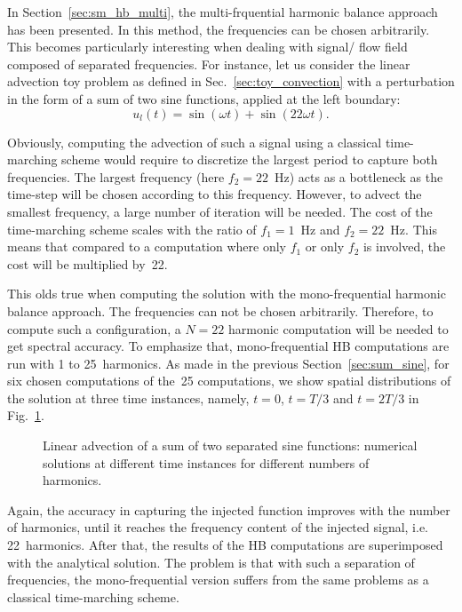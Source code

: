 
In Section~\ref{sec:sm_hb_multi}, the multi-frquential harmonic
balance approach has been presented. In this method,
the frequencies can be chosen arbitrarily. This becomes particularly
interesting when dealing with signal/ flow field composed of separated
frequencies. For instance, let us consider the linear advection toy problem
as defined in Sec.~\ref{sec:toy_convection} with 
a perturbation 
in the form of a sum of two sine functions,
applied at the left boundary:
\begin{equation}
    u_l(t) = \sin(\omega t) + \sin(22 \omega t).
    \label{eq:multifreq_inj_func}
\end{equation}

Obviously, computing the advection of such a signal using
a classical time-marching scheme would require to discretize the
largest period to capture both frequencies. The largest frequency
(here $f_2 = 22$~Hz) acts as a bottleneck as the time-step will be chosen
according to this frequency. However, to advect the smallest frequency,
a large number of iteration will be needed. The cost of the time-marching
scheme scales with the ratio of $f_1= 1 $~Hz and $f_2=22$~Hz. This
means that compared to a computation where only $f_1$ or only $f_2$
is involved, the cost will be multiplied by~22.

This olds true when computing the solution with the mono-frequential
harmonic balance approach. The frequencies can not be chosen arbitrarily.
Therefore, to compute such a configuration, a $N=22$ harmonic computation
will be needed to get spectral accuracy. To emphasize that, mono-frequential
HB computations are run with 1 to 25~harmonics.
As made in the previous Section~\ref{sec:sum_sine}, 
for six chosen computations of the~25 computations, 
we show spatial distributions of the solution
at three time instances, namely, $t=0$, $t=T/3$ and $t=2T/3$
in Fig.~\ref{fig:inj_multifreq_tsm}.
\begin{figure}[htb]
  \centering
  \caption{Linear advection of a sum of two separated sine functions: 
  numerical solutions at different time instances for different numbers of harmonics.}
  \label{fig:inj_multifreq_tsm}
\end{figure}
Again, the accuracy in capturing the injected function
improves with the number of harmonics,
until it reaches the frequency content
of the injected signal, i.e. 22~harmonics.
After that, the results of the HB computations are
superimposed with the analytical solution. 
The problem is that with such a separation of frequencies,
the mono-frequential version suffers from the same
problems as a classical time-marching scheme.

